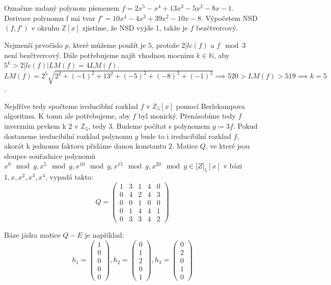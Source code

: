 \documentclass[12pt, a4paper]{article}
\begin{document}
\section{}
Označme zadaný polynom písmenem $f = 2 x^5 - x^4 + 13 x^3 - 5 x^2 - 8 x - 1$. Derivace polynomu f má tvar $f' = 10x^4-4x^3+39x^2-10x-8$. Výpočetem NSD$(f,f')$ v okruhu $\mathbb{Z}[x]$ zjistíme, že NSD vyjde 1, takže je $f$ bezčtvercový.

Nejmenší prvočíslo $p$, které můžeme použít je $5$, protože $2 | lc(f)$ a $f \mod 3$ není bezčtvercový. Dále potřebujeme najít vhodnou mocninu $k \in \mathbb{N}$, aby $5^k > 2|lc(f)|LM(f) = 4LM(f)$. $LM(f) = 2^5 \sqrt{2^2+(-1)^2+13^2+(-5)^2+(-8)^2+(-1)^2} \implies 520 > LM(f) > 519 \implies k=5$. 

Nejdříve tedy spočteme ireduciblní rozklad $f$ v $\mathbb{Z}_5[x]$ pomocí Berlekampova algoritmu. K tomu ale potřebujeme, aby $f$ byl monický. Přenásobíme tedy $f$ inverzním prvkem k $2$ v $\mathbb{Z}_5$, tedy $3$. Budeme počítat s polynomem $g \coloneqq 3f$. Pokud dostaneme ireducibilní rozklad polynomu $g$ bude to i ireducibilní rozklad $f$, akorát k jednomu faktoru přidáme danou konstantu $2$. Matice $Q$, ve které jsou sloupce souřadnice polynomů $x^0 \mod g, x^5 \mod g, x^{10} \mod g, x^{15} \mod g, x^{20} \mod g \in \mathbb[Z]_5[x]$ v bázi $1,x,x^2,x^3,x^4$, vypadá takto:
\[
Q = \begin{pmatrix}
1 & 3 & 1 & 4 & 0 \\
0 & 4 & 2 & 4 & 3 \\
0 & 0 & 1 & 0 & 0 \\
0 & 1 & 4 & 4 & 1 \\
0 & 3 & 3 & 4 & 2
\end{pmatrix}
\]

Báze jádra matice $Q-E$ je například:
\[
h_1 = \begin{pmatrix}
1 \\
0 \\
0 \\
0 \\
0 
\end{pmatrix},
h_2 = \begin{pmatrix}
0 \\
1 \\
2 \\
0 \\
1 
\end{pmatrix}, 
h_3 = \begin{pmatrix}
0 \\
2 \\
0 \\
1 \\
0 
\end{pmatrix}
\]
\end{document}
